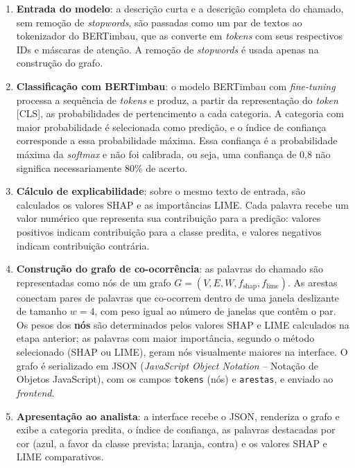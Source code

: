 \documentclass[
    12pt,                %
    openright,           %
    oneside,             %
    a4paper,             %
    english,             %
    brazil               %
]{abntex2}
\begin{document}
\begin{enumerate}
    \item \textbf{Entrada do modelo}: a descrição curta e a descrição completa do chamado, sem remoção de \textit{stopwords}, são passadas como um par de textos ao tokenizador do BERTimbau, que as converte em \textit{tokens} com seus respectivos IDs e máscaras de atenção. A remoção de \textit{stopwords} é usada apenas na construção do grafo.

    \item \textbf{Classificação com BERTimbau}: o modelo BERTimbau com \textit{fine-tuning} processa a sequência de \textit{tokens} e produz, a partir da representação do \textit{token} [CLS], as probabilidades de pertencimento a cada categoria. A categoria com maior probabilidade é selecionada como predição, e o índice de confiança corresponde a essa probabilidade máxima. Essa confiança é a probabilidade máxima da \textit{softmax} e não foi calibrada, ou seja, uma confiança de 0,8 não significa necessariamente 80\% de acerto.

    \item \textbf{Cálculo de explicabilidade}: sobre o mesmo texto de entrada, são calculados os valores SHAP e as importâncias LIME. Cada palavra recebe um valor numérico que representa sua contribuição para a predição: valores positivos indicam contribuição para a classe predita, e valores negativos indicam contribuição contrária.

    \item \textbf{Construção do grafo de co-ocorrência}: as palavras do chamado são representadas como nós de um grafo $G = (V, E, W, f_{\text{shap}}, f_{\text{lime}})$. As arestas conectam pares de palavras que co-ocorrem dentro de uma janela deslizante de tamanho $w = 4$, com peso igual ao número de janelas que contêm o par. Os pesos dos \textbf{nós} são determinados pelos valores SHAP e LIME calculados na etapa anterior; as palavras com maior importância, segundo o método selecionado (SHAP ou LIME), geram nós visualmente maiores na interface. O grafo é serializado em JSON (\textit{JavaScript Object Notation} -- Notação de Objetos JavaScript), com os campos \texttt{tokens} (nós) e \texttt{arestas}, e enviado ao \textit{frontend}.

    \item \textbf{Apresentação ao analista}: a interface recebe o JSON, renderiza o grafo e exibe a categoria predita, o índice de confiança, as palavras destacadas por cor (azul, a favor da classe prevista; laranja, contra) e os valores SHAP e LIME comparativos.
\end{enumerate}
\end{document}
